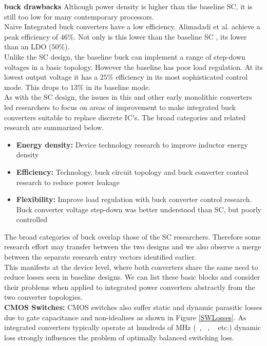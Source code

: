 \documentclass[letterpaper,twocolumn,10pt]{article}
\begin{document}
\textbf{buck drawbacks} Although power density is higher than the baseline SC, it is still too low for many contemporary processors. \\
Naive Integrated buck converters have a low efficiency. Alimadadi et al. \cite{Alimadadi2008} achieve a peak efficiency of $46\%$. Not only is this lower than the baseline SC \cite{Viraj2007}, its lower than an LDO ($50\%$).\\
Unlike the SC design, the baseline buck can implement a range of step-down voltages in a basic topology. However the baseline has poor load regulation. At its lowest output voltage it has a $25\%$ efficiency in its most sophisticated control mode. This drops to $13\%$ in its baseline mode.\\ 
As with the SC design, the issues in this and other early monolithic converters led researchers to focus on areas of improvement to make integrated buck converters suitable to replace discrete IC's. The broad categories and related research are summarized below.
\begin{itemize}
\item \textbf{Energy density: }Device technology research to improve inductor energy density
\item \textbf{Efficiency: }Technology, buck circuit topology and buck converter control research to reduce power leakage
\item \textbf{Flexibility: }Improve load regulation with buck converter control research. Buck converter voltage step-down was better understood than SC, but poorly controlled
\end{itemize}
The broad categories of buck overlap those of the SC researchers. Therefore some research effort may transfer between the two designs and we also observe a merge between the separate research entry vectors identified earlier.\\
This manifests at the device level, where both converters share the same need to reduce losses seen in baseline designs. We can list these basic blocks and consider their problems when applied to integrated power converters abstractly from the two converter topologies.\\  
\textbf{CMOS Switches: }
CMOS switches also suffer static and dynamic parasitic losses due to gate capacitance and non-idealises as shown in Figure \ref{SWLosses}. As integrated converters typically operate at hundreds of MHz (~\cite{Alimadadi2008}, ~\cite{Bathily2012}, ~\cite{Sturcken2013} etc.) dynamic loss strongly influences the problem of optimally balanced switching loss.\\ %
\end{document}
